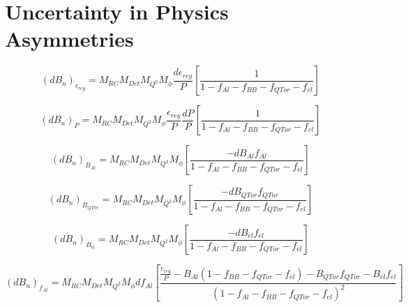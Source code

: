 \section{Uncertainty in Physics Asymmetries}
\label{Uncertainty in Physics Asymmetries}

\begin{equation} \label{equ:dPhysicsAsymmetryAmsr}
(dB_{n})_{\epsilon_{reg}} = M_{RC}M_{Det}M_{Q^{2}}M_{\phi} \frac{d\epsilon_{reg}}{P} \left[ \frac{ 1 }{1 - f_{Al} - f_{BB} - f_{QTor} - f_{el}} \right] 
\end{equation}

\begin{equation} \label{equ:dPhysicsAsymmetryP}
(dB_{n})_{P} = M_{RC}M_{Det}M_{Q^{2}}M_{\phi} \frac{\epsilon_{reg}}{P} \frac{dP}{P} \left[ \frac{ 1 }{1 - f_{Al} - f_{BB} - f_{QTor} - f_{el}} \right] 
\end{equation}

\begin{equation} \label{equ:dPhysicsAsymmetryBAl}
(dB_{n})_{B_{Al}} = M_{RC}M_{Det}M_{Q^{2}}M_{\phi} \left[ \frac{ -dB_{Al}f_{Al} }{1 - f_{Al} - f_{BB} - f_{QTor} - f_{el}} \right] 
\end{equation}


\begin{equation} \label{equ:dPhysicsAsymmetryBQTor}
(dB_{n})_{B_{QTor}} = M_{RC}M_{Det}M_{Q^{2}}M_{\phi} \left[ \frac{ -dB_{QTor}f_{QTor} }{1 - f_{Al} - f_{BB} - f_{QTor} - f_{el}} \right] 
\end{equation}

\begin{equation} \label{equ:dPhysicsAsymmetryBel}
(dB_{n})_{B_{el}} = M_{RC}M_{Det}M_{Q^{2}}M_{\phi} \left[ \frac{ -dB_{el}f_{el} }{1 - f_{Al} - f_{BB} - f_{QTor} - f_{el}} \right] 
\end{equation}

\begin{equation} \label{equ:dPhysicsAsymmetryfAl}
(dB_{n})_{f_{Al}} = M_{RC}M_{Det}M_{Q^{2}}M_{\phi} df_{Al} \left[ \frac{ \frac{\epsilon_{reg}}{P} - B_{Al}(1 - f_{BB} - f_{QTor} - f_{el}) - B_{QTor}f_{QTor} - B_{el}f_{el} }{ (1 - f_{Al} - f_{BB} - f_{QTor} - f_{el})^{2} } \right] 
\end{equation}

